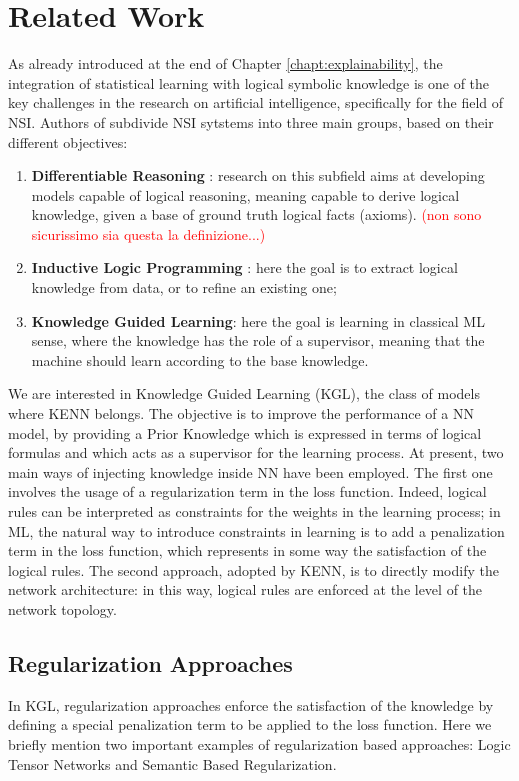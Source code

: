  
 \section{Related Work}
 As already introduced at the end of Chapter \ref{chapt:explainability}, the integration of statistical learning with logical symbolic knowledge is one of the key challenges in the research on artificial intelligence, specifically for the field of NSI. Authors of \cite{daniele2019kenn,serafini2016logic} subdivide NSI sytstems into three main groups, based on their different objectives:
 \begin{enumerate}
 	\item \textbf{Differentiable Reasoning }: research on this subfield aims at developing models capable of logical reasoning, meaning capable to derive logical knowledge, given a base of ground truth logical facts (axioms). \textcolor{red}{(non sono sicurissimo sia questa la definizione...)}
 	\item \textbf{Inductive Logic Programming} : here the goal is to extract logical knowledge from data, or to refine an existing one;
 	\item \textbf{Knowledge Guided Learning}: here the goal is learning in classical ML sense, where the knowledge has the role of a supervisor, meaning that the machine should learn according to the base knowledge.
 \end{enumerate}

 We are interested in Knowledge Guided Learning (KGL), the class of models where KENN belongs. The objective is to improve the performance of a NN model, by providing a Prior Knowledge which is expressed in terms of logical formulas and which acts as a supervisor for the learning process. At present, two main ways of injecting knowledge inside NN have been employed. The first one involves the usage of a regularization term in the loss function. Indeed, logical rules can be interpreted as constraints for the weights in the learning process; in ML, the natural way to introduce constraints in learning is to add a penalization term in the loss function, which represents in some way the satisfaction of the logical rules. The second approach, adopted by KENN, is to directly modify the network architecture: in this way, logical rules are enforced at the level of the network topology.
 
 \subsection{Regularization Approaches}
In KGL, regularization approaches enforce the satisfaction of the knowledge by defining a special penalization term to be applied to the loss function. Here we briefly mention two important examples of regularization based approaches: Logic Tensor Networks and Semantic Based Regularization.
 

